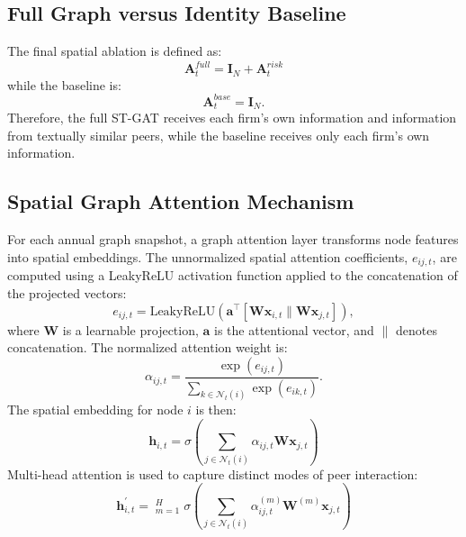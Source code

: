 \documentclass[11pt, a4paper]{article}
\begin{document}
\subsection{Full Graph versus Identity Baseline}
The final spatial ablation is defined as:
\begin{equation}
\mathbf{A}_{t}^{full} = \mathbf{I}_{N} + \mathbf{A}_{t}^{risk}
\end{equation}
while the baseline is:
\begin{equation}
\mathbf{A}_{t}^{base} = \mathbf{I}_{N}.
\end{equation}
Therefore, the full ST-GAT receives each firm's own information and information from textually similar peers, while the baseline receives only each firm's own information.

\subsection{Spatial Graph Attention Mechanism}
For each annual graph snapshot, a graph attention layer transforms node features into spatial embeddings. The unnormalized spatial attention coefficients, $e_{ij,t}$, are computed using a LeakyReLU activation function applied to the concatenation of the projected vectors:
\begin{equation}
e_{ij,t} = \text{LeakyReLU}\left(\mathbf{a}^{\top}[\mathbf{W}\mathbf{x}_{i,t} \parallel \mathbf{W}\mathbf{x}_{j,t}]\right),
\end{equation}
where $\mathbf{W}$ is a learnable projection, $\mathbf{a}$ is the attentional vector, and $\parallel$ denotes concatenation. The normalized attention weight is:
\begin{equation}
\alpha_{ij,t} = \frac{\exp(e_{ij,t})}{\sum_{k\in \mathcal{N}_{t}(i)}\exp(e_{ik,t})}.
\end{equation}
The spatial embedding for node $i$ is then:
\begin{equation}
\mathbf{h}_{i,t} = \sigma\left(\sum_{j\in \mathcal{N}_{t}(i)}\alpha_{ij,t}\mathbf{W}\mathbf{x}_{j,t}\right)
\end{equation}
Multi-head attention is used to capture distinct modes of peer interaction:
\begin{equation}
\mathbf{h}_{i,t}^{\prime} = \mathop{\Big\Vert}_{m=1}^{H}\sigma\left(\sum_{j\in \mathcal{N}_{t}(i)}\alpha_{ij,t}^{(m)}\mathbf{W}^{(m)}\mathbf{x}_{j,t}\right)
\end{equation}
\end{document}

